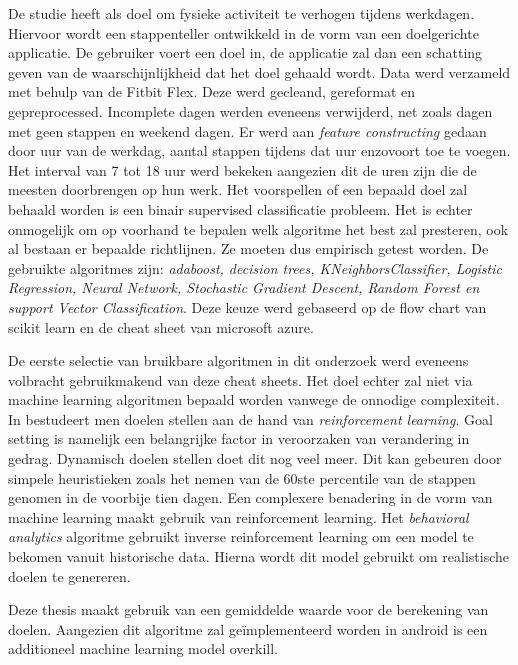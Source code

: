 De studie \citep{ref4} heeft als doel om fysieke activiteit te verhogen tijdens werkdagen. Hiervoor wordt een stappenteller ontwikkeld in de vorm van een doelgerichte applicatie. De gebruiker voert een doel in, de applicatie zal dan een schatting geven van de waarschijnlijkheid dat het doel gehaald wordt. Data werd verzameld met behulp van de Fitbit Flex. Deze werd gecleand, gereformat en gepreprocessed. Incomplete dagen werden eveneens verwijderd, net zoals dagen met geen stappen en weekend dagen. Er werd aan \textit{feature constructing} gedaan door uur van de werkdag, aantal stappen tijdens dat uur enzovoort toe te voegen. Het interval van 7 tot 18 uur werd bekeken aangezien dit de uren zijn die de meesten doorbrengen op hun werk.
Het voorspellen of een bepaald doel zal behaald worden is een binair supervised classificatie probleem. Het is echter onmogelijk om op voorhand te bepalen welk algoritme het best zal presteren, ook al bestaan er bepaalde richtlijnen. Ze moeten dus empirisch getest worden. De gebruikte algoritmes zijn: \textit{adaboost, decision trees, KNeighborsClassifier, Logistic Regression, Neural Network, Stochastic Gradient Descent, Random Forest en support Vector Classification}. Deze keuze werd gebaseerd op de flow chart van scikit learn en de cheat sheet van microsoft azure. 

De eerste selectie van bruikbare algoritmen in dit onderzoek werd eveneens volbracht gebruikmakend van deze cheat sheets. Het doel echter zal niet via machine learning algoritmen bepaald worden vanwege de onnodige complexiteit.\\

In \citep{ref11} bestudeert men doelen stellen aan de hand van \textit{reinforcement learning}. Goal setting is namelijk een belangrijke factor in veroorzaken van verandering in gedrag. Dynamisch doelen stellen doet dit nog veel meer. Dit kan gebeuren door simpele heuristieken zoals het nemen van de 60ste percentile van de stappen genomen in de voorbije tien dagen. Een complexere benadering in de vorm van machine learning maakt gebruik van reinforcement learning. Het \textit{behavioral analytics} algoritme gebruikt inverse reinforcement learning om een model te bekomen vanuit historische data. Hierna wordt dit model gebruikt om realistische doelen te genereren.

Deze thesis maakt gebruik van een gemiddelde waarde voor de berekening van doelen. Aangezien dit algoritme zal geïmplementeerd worden in android is een additioneel machine learning model overkill.\\

